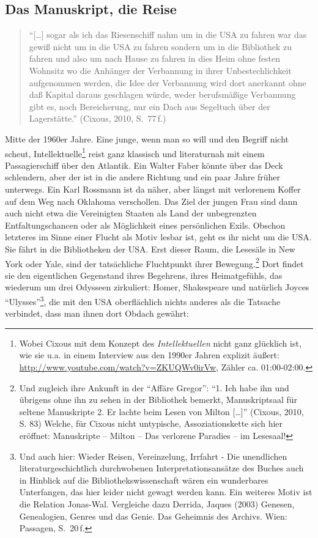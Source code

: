 \documentclass[output=paper]{langscibook}
\begin{document}
\subsection*{Das Manuskript, die Reise}

\begin{quote}
\enquote{{[}\ldots{]} sogar als ich das Riesenschiff nahm um in die USA
zu fahren war das gewiß nicht um in die USA zu fahren sondern um in die
Bibliothek zu fahren und also um nach Hause zu fahren in dies Heim ohne
festen Wohnsitz wo die Anhänger der Verbannung in ihrer
Unbestechlichkeit aufgenommen werden, die Idee der Verbannung wird dort
anerkannt ohne daß Kapital daraus geschlagen würde, weder berufsmäßige
Verbannung gibt es, noch Bereicherung, nur ein Dach aus Segeltuch über
der Lagerstätte.} (Cixous, 2010, S.~77\,f.)
\end{quote}

\noindent Mitte der 1960er Jahre. Eine junge, wenn man so will und den Begriff
nicht scheut, Intellektuelle\footnote{Wobei Cixous mit dem Konzept des
  \emph{Intellektuellen} nicht ganz glücklich ist, wie sie u.a. in einem
  Interview aus den 1990er Jahren explizit äußert:
  \url{http://www.youtube.com/watch?v=ZKUQWv0irVw}, Zähler ca.
  01:00-02:00.} reist ganz klassisch und literaturnah mit einem
Passagierschiff über den Atlantik. Ein Walter Faber könnte über das Deck
schlendern, aber der ist in die andere Richtung und ein paar Jahre
früher unterwegs. Ein Karl Rossmann ist da näher, aber längst mit
verlorenem Koffer auf dem Weg nach Oklahoma verschollen. Das Ziel der
jungen Frau sind dann auch nicht etwa die Vereinigten Staaten als Land
der unbegrenzten Entfaltungschancen oder als Möglichkeit eines
persönlichen Exils. Obschon letzteres im Sinne einer Flucht als Motiv
lesbar ist, geht es ihr nicht um die USA. Sie fährt in die Bibliotheken
der USA. Erst dieser Raum, die Lesesäle in New York oder Yale, sind der
tatsächliche Fluchtpunkt ihrer Bewegung.\footnote{Und zugleich ihre
  Ankunft in der \enquote{Affäre Gregor}: \enquote{1. Ich habe ihn und
  übrigens ohne ihn zu sehen in der Bibliothek bemerkt, Manuskriptsaal
  für seltene Manuskripte 2. Er lachte beim Lesen von Milton
  {[}\ldots{]}} (Cixous, 2010, S. 83) Welche, für Cixous nicht
  untypische, Assoziationskette sich hier eröffnet: Manuskripte --
  Milton -- Das verlorene Paradies -- im Lesesaal!} Dort findet sie den
eigentlichen Gegenstand ihres Begehrens, ihres Heimatgefühls, das
wiederum um drei Odysseen zirkuliert: Homer, Shakespeare und natürlich
Joyces \enquote{Ulysses}\footnote{Und auch hier: Wieder Reisen,
  Vereinzelung, Irrfahrt - Die unendlichen literaturgeschichtlich
  durchwobenen Interpretationsansätze des Buches auch in Hinblick auf
  die Bibliothekswissenschaft wären ein wunderbares Unterfangen, das
  hier leider nicht gewagt werden kann. Ein weiteres Motiv ist die
  Relation Jonas-Wal. Vergleiche dazu Derrida, Jaques (2003) Genesen,
  Genealogien, Genres und das Genie. Das Geheimnis des Archivs. Wien:
  Passagen, S.~20\,f.}, die mit den USA oberflächlich nichts anderes als
die Tatsache verbindet, dass man ihnen dort Obdach gewährt:
\end{document}
